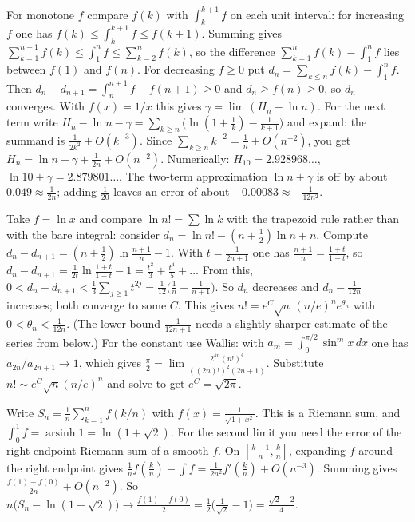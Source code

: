 \documentclass[11pt,a4paper]{article}
\begin{document}

 For monotone $f$ compare $f(k)$ with $\int_k^{k+1}f$ on each unit interval: for increasing $f$ one has $f(k)\le\int_k^{k+1}f\le f(k+1)$. Summing gives $\sum_{k=1}^{n-1}f(k)\le\int_1^n f\le\sum_{k=2}^n f(k)$, so the difference $\sum_{k=1}^n f(k)-\int_1^n f$ lies between $f(1)$ and $f(n)$.
 For decreasing $f\ge 0$ put $d_n=\sum_{k\le n}f(k)-\int_1^n f$. Then $d_n-d_{n+1}=\int_n^{n+1}f-f(n+1)\ge 0$ and $d_n\ge f(n)\ge 0$, so $d_n$ converges. With $f(x)=1/x$ this gives $\gamma=\lim(H_n-\ln n)$.
 For the next term write $H_n-\ln n-\gamma=\sum_{k\ge n}\bigl(\ln(1+\tfrac1k)-\tfrac1{k+1}\bigr)$ and expand: the summand is $\frac1{2k^2}+O(k^{-3})$. Since $\sum_{k\ge n}k^{-2}=\frac1n+O(n^{-2})$, you get $H_n=\ln n+\gamma+\frac1{2n}+O(n^{-2})$.
 Numerically: $H_{10}=2.928968\ldots$, $\ln 10+\gamma=2.879801\ldots$. The two-term approximation $\ln n+\gamma$ is off by about $0.049\approx\frac1{2n}$; adding $\frac1{20}$ leaves an error of about $-0.00083\approx-\frac1{12n^2}$.

 Take $f=\ln x$ and compare $\ln n!=\sum\ln k$ with the trapezoid rule rather than with the bare integral: consider $d_n=\ln n!-(n+\tfrac12)\ln n+n$.
 Compute $d_n-d_{n+1}=(n+\tfrac12)\ln\frac{n+1}{n}-1$. With $t=\frac1{2n+1}$ one has $\frac{n+1}{n}=\frac{1+t}{1-t}$, so $d_n-d_{n+1}=\frac{1}{2t}\ln\frac{1+t}{1-t}-1=\frac{t^2}3+\frac{t^4}5+\dots$
 From this, $0<d_n-d_{n+1}<\frac13\sum_{j\ge1}t^{2j}=\frac1{12}\bigl(\frac1n-\frac1{n+1}\bigr)$. So $d_n$ decreases and $d_n-\frac1{12n}$ increases; both converge to some $C$. This gives $n!=e^{C}\sqrt n\,(n/e)^n e^{\theta_n}$ with $0<\theta_n<\frac1{12n}$. (The lower bound $\frac1{12n+1}$ needs a slightly sharper estimate of the series from below.)
 For the constant use Wallis: with $a_m=\int_0^{\pi/2}\sin^m x\,dx$ one has $a_{2n}/a_{2n+1}\to1$, which gives $\frac{\pi}{2}=\lim\frac{2^{4n}(n!)^4}{((2n)!)^2(2n+1)}$. Substitute $n!\sim e^C\sqrt n(n/e)^n$ and solve to get $e^{C}=\sqrt{2\pi}$.

 Write $S_n=\frac1n\sum_{k=1}^n f(k/n)$ with $f(x)=\frac1{\sqrt{1+x^2}}$. This is a Riemann sum, and $\int_0^1 f=\operatorname{arsinh}1=\ln(1+\sqrt2)$.
 For the second limit you need the error of the right-endpoint Riemann sum of a smooth $f$. On $[\frac{k-1}n,\frac kn]$, expanding $f$ around the right endpoint gives $\frac1nf(\frac kn)-\int f=\frac{1}{2n^2}f'(\frac kn)+O(n^{-3})$. Summing gives $\frac{f(1)-f(0)}{2n}+O(n^{-2})$.
 So $n\bigl(S_n-\ln(1+\sqrt2)\bigr)\to\frac{f(1)-f(0)}2=\frac{1}{2}\bigl(\frac1{\sqrt2}-1\bigr)=\frac{\sqrt2-2}{4}$.
\end{document}
